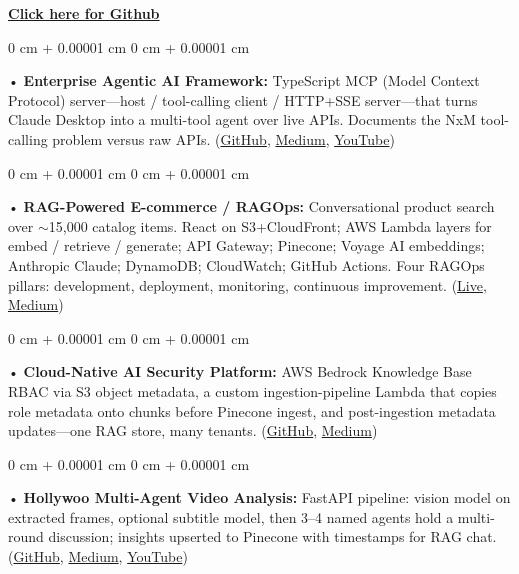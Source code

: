\documentclass[10pt, letterpaper]{article}
\newenvironment{onecolentry}{
    \begin{adjustwidth}{
        0 cm + 0.00001 cm
    }{
        0 cm + 0.00001 cm
    }
}{
    \end{adjustwidth}
} %
\begin{document}
\textbf{\href{https://github.com/daedalus-s}{Click here for Github}}
\begin{onecolentry}
     • \textbf{Enterprise Agentic AI Framework:} TypeScript MCP (Model Context Protocol) server---host / tool-calling client / HTTP+SSE server---that turns Claude Desktop into a multi-tool agent over live APIs. Documents the NxM tool-calling problem versus raw APIs. (\href{https://github.com/daedalus-s/dota2-mcp-server}{GitHub}, \href{https://medium.com/@sreenikethaathreya/get-good-at-using-ai-noob-5d2576203112}{Medium}, \href{https://www.youtube.com/watch?v=op2gTYyFb5U}{YouTube})
\end{onecolentry}
\begin{onecolentry}
     • \textbf{RAG-Powered E-commerce / RAGOps:} Conversational product search over $\sim$15,000 catalog items. React on S3+CloudFront; AWS Lambda layers for embed / retrieve / generate; API Gateway; Pinecone; Voyage AI embeddings; Anthropic Claude; DynamoDB; CloudWatch; GitHub Actions. Four RAGOps pillars: development, deployment, monitoring, continuous improvement. (\href{https://prorecsa.co}{Live}, \href{https://medium.com/@sreenikethaathreya/from-rags-to-riches-bba8a671d5e6}{Medium})
\end{onecolentry}
\begin{onecolentry}
     • \textbf{Cloud-Native AI Security Platform:} AWS Bedrock Knowledge Base RBAC via S3 object metadata, a custom ingestion-pipeline Lambda that copies role metadata onto chunks before Pinecone ingest, and post-ingestion metadata updates---one RAG store, many tenants. (\href{https://github.com/daedalus-s/bedrock-acl-metadata}{GitHub}, \href{https://medium.com/@sreenikethaathreya/building-a-permission-aware-genai-application-on-amazon-bedrock-8fdc2410dd43}{Medium})
\end{onecolentry}
\begin{onecolentry}
     • \textbf{Hollywoo Multi-Agent Video Analysis:} FastAPI pipeline: vision model on extracted frames, optional subtitle model, then 3--4 named agents hold a multi-round discussion; insights upserted to Pinecone with timestamps for RAG chat. (\href{https://github.com/daedalus-s/fireworks-video-discussion}{GitHub}, \href{https://medium.com/@sreenikethaathreya/hollywoo-ai-video-analysis-5eae37ca7e16}{Medium}, \href{https://www.youtube.com/watch?v=KBs_3V0OAgU}{YouTube})
\end{onecolentry}
\vspace{2 pt}
        \vspace{2 pt }
\end{document}
